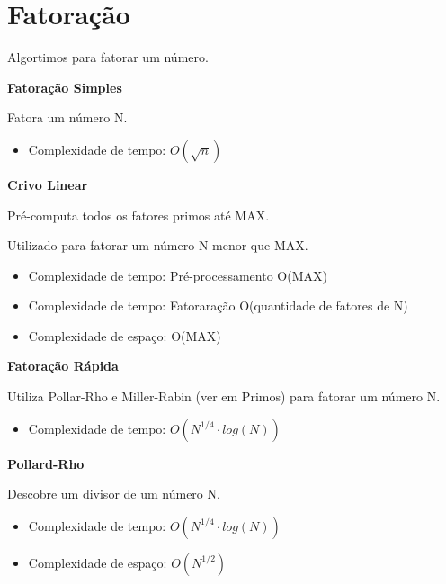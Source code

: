 \documentclass[11pt, a4paper, oneside]{book}
\begin{document}
\hfill

\section{Fatoração}


Algortimos para fatorar um número.



\textbf{Fatoração Simples} 

Fatora um número N.



\begin{itemize}
\item Complexidade de tempo: $O(\sqrt n )$
\end{itemize}



\textbf{Crivo Linear} 

Pré-computa todos os fatores primos até MAX.

Utilizado para fatorar um número N menor que MAX.



\begin{itemize}
\item Complexidade de tempo: Pré-processamento O(MAX)
\item Complexidade de tempo: Fatoraração O(quantidade de fatores de N)
\item Complexidade de espaço: O(MAX)
\end{itemize}



\textbf{Fatoração Rápida} 

Utiliza Pollar-Rho e Miller-Rabin (ver em Primos) para fatorar um número N.



\begin{itemize}
\item Complexidade de tempo: $O(N^{1/4} \cdot log(N))$
\end{itemize}



\textbf{Pollard-Rho} 

Descobre um divisor de um número N.



\begin{itemize}
\item Complexidade de tempo: $O(N^{1/4} \cdot log(N))$
\item Complexidade de espaço: $O(N^{1/2})$
\end{itemize}
\end{document}
